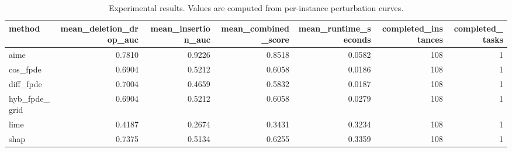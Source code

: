 \begin{table}[t]
\caption{Experimental results. Values are computed from per-instance perturbation curves.}
\label{tab:main_results_computed}
\centering
\begin{tabular}{lrrrrrr}
\toprule
method & mean\_deletion\_drop\_auc & mean\_insertion\_auc & mean\_combined\_score & mean\_runtime\_seconds & completed\_instances & completed\_tasks \\
\midrule
aime & 0.7810 & 0.9226 & 0.8518 & 0.0582 & 108 & 1 \\
cos\_fpde & 0.6904 & 0.5212 & 0.6058 & 0.0186 & 108 & 1 \\
diff\_fpde & 0.7004 & 0.4659 & 0.5832 & 0.0187 & 108 & 1 \\
hyb\_fpde\_grid & 0.6904 & 0.5212 & 0.6058 & 0.0279 & 108 & 1 \\
lime & 0.4187 & 0.2674 & 0.3431 & 0.3234 & 108 & 1 \\
shap & 0.7375 & 0.5134 & 0.6255 & 0.3359 & 108 & 1 \\
\bottomrule
\end{tabular}

\end{table}
